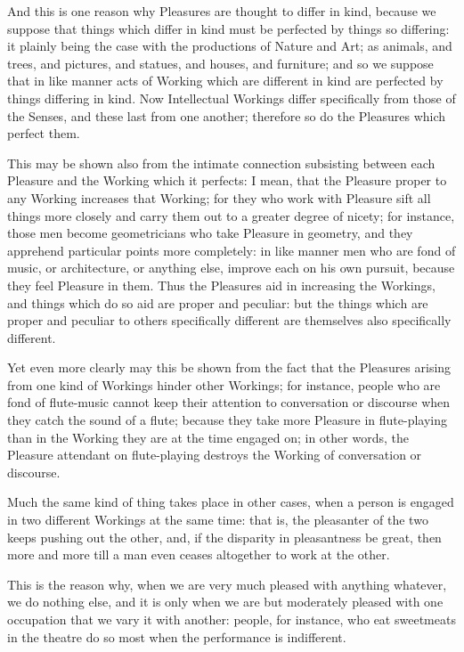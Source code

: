 And this is one reason why Pleasures are thought to differ in kind, because we
suppose that things which differ in kind must be perfected by things so
differing: it plainly being the case with the productions of Nature and Art; as
animals, and trees, and pictures, and statues, and houses, and furniture; and
so we suppose that in like manner acts of Working which are different in kind
are perfected by things differing in kind. Now Intellectual Workings differ
specifically from those of the Senses, and these last from one another;
therefore so do the Pleasures which perfect them.

This may be shown also from the intimate connection subsisting between each
Pleasure and the Working which it perfects: I mean, that the Pleasure proper to
any Working increases that Working; for they who work with Pleasure sift all
things more closely and carry them out to a greater degree of nicety; for
instance, those men become geometricians who take Pleasure in geometry, and
they apprehend particular points more completely: in like manner men who are
fond of music, or architecture, or anything else, improve each on his own
pursuit, because they feel Pleasure in them. Thus the Pleasures aid in
increasing the Workings, and things which do so aid are proper and peculiar:
but the things which are proper and peculiar to others specifically different
are themselves also specifically different.

Yet even more clearly may this be shown from the fact that the Pleasures
arising from one kind of Workings hinder other Workings; for instance, people
who are fond of flute-music cannot keep their attention to conversation or
discourse when they catch the sound of a flute; because they take more Pleasure
in flute-playing than in the Working they are at the time engaged on; in other
words, the Pleasure attendant on flute-playing destroys the Working of
conversation or discourse.

Much the same kind of thing takes place in other cases, when a person is
engaged in two different Workings at the same time: that is, the pleasanter of
the two keeps pushing out the other, and, if the disparity in pleasantness be
great, then more and more till a man even ceases altogether to work at the
other.

This is the reason why, when we are very much pleased with anything whatever,
we do nothing else, and it is only when we are but moderately pleased with one
occupation that we vary it with another: people, for instance, who eat
sweetmeats in the theatre do so most when the performance is indifferent.

